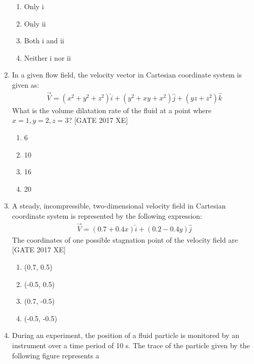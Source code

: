 \documentclass[journal,12pt,onecolumn]{IEEEtran}
\theoremstyle{remark}
\begin{document}
\begin{enumerate}
\begin{multicols}{2}
\begin{enumerate}
    \item Only i
    \item Only ii
    \item Both i and ii
    \item Neither i nor ii
\end{enumerate}
\end{multicols}
\item In a given flow field, the velocity vector in Cartesian coordinate system is given as:
\begin{align}
\vec{V} = \left( x^2 + y^2 + z^2 \right)\hat{i} + \left( y^2 + xy + x^2 \right)\hat{j} + \left( yz + z^2 \right)\hat{k}
\end{align}
What is the volume dilatation rate of the fluid at a point where $x = 1, y = 2, z = 3$?  
\hfill [GATE 2017 XE]

\begin{multicols}{2}
\begin{enumerate}
    \item 6
    \item 10
    \item 16
    \item 20
\end{enumerate}
\end{multicols}

\item A steady, incompressible, two-dimensional velocity field in Cartesian coordinate system is represented by the following expression:
\begin{align}
\vec{V} = (0.7 + 0.4x)\hat{i} + (0.2 - 0.4y)\hat{j}
\end{align}
The coordinates of one possible stagnation point of the velocity field are  
\hfill [GATE 2017 XE]

\begin{multicols}{2}
\begin{enumerate}
    \item (0.7, 0.5)
    \item (-0.5, 0.5)
    \item (0.7, -0.5)
    \item (-0.5, -0.5)
\end{enumerate}
\end{multicols}

\item During an experiment, the position of a fluid particle is monitored by an instrument over a time period of 10 s. The trace of the particle given by the following figure represents a


\end{enumerate}
\end{document}
